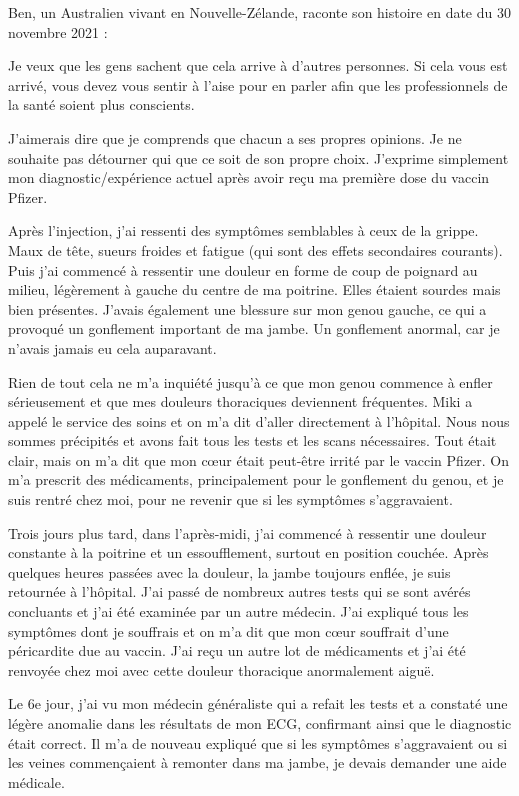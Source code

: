 Ben, un Australien vivant en Nouvelle-Zélande, raconte son histoire en date du
30 novembre 2021 :

Je veux que les gens sachent que cela arrive à d'autres personnes. Si cela vous
est arrivé, vous devez vous sentir à l'aise pour en parler afin que les
professionnels de la santé soient plus conscients.

J'aimerais dire que je comprends que chacun a ses propres opinions. Je ne
souhaite pas détourner qui que ce soit de son propre choix. J'exprime simplement
mon diagnostic/expérience actuel après avoir reçu ma première dose du vaccin
Pfizer.

Après l'injection, j'ai ressenti des symptômes semblables à ceux de la
grippe. Maux de tête, sueurs froides et fatigue (qui sont des effets secondaires
courants). Puis j'ai commencé à ressentir une douleur en forme de coup de
poignard au milieu, légèrement à gauche du centre de ma poitrine. Elles étaient
sourdes mais bien présentes. J'avais également une blessure sur mon genou
gauche, ce qui a provoqué un gonflement important de ma jambe. Un gonflement
anormal, car je n'avais jamais eu cela auparavant.

Rien de tout cela ne m'a inquiété jusqu'à ce que mon genou commence à enfler
sérieusement et que mes douleurs thoraciques deviennent fréquentes. Miki a
appelé le service des soins et on m'a dit d'aller directement à l'hôpital. Nous
nous sommes précipités et avons fait tous les tests et les scans
nécessaires. Tout était clair, mais on m'a dit que mon cœur était peut-être
irrité par le vaccin Pfizer. On m'a prescrit des médicaments, principalement
pour le gonflement du genou, et je suis rentré chez moi, pour ne revenir que si
les symptômes s'aggravaient.

Trois jours plus tard, dans l'après-midi, j'ai commencé à ressentir une douleur
constante à la poitrine et un essoufflement, surtout en position couchée. Après
quelques heures passées avec la douleur, la jambe toujours enflée, je suis
retournée à l'hôpital. J'ai passé de nombreux autres tests qui se sont avérés
concluants et j'ai été examinée par un autre médecin. J'ai expliqué tous les
symptômes dont je souffrais et on m'a dit que mon cœur souffrait d'une
péricardite due au vaccin. J'ai reçu un autre lot de médicaments et j'ai été
renvoyée chez moi avec cette douleur thoracique anormalement aiguë.

Le 6e jour, j'ai vu mon médecin généraliste qui a refait les tests et a constaté
une légère anomalie dans les résultats de mon ECG, confirmant ainsi que le
diagnostic était correct. Il m'a de nouveau expliqué que si les symptômes
s'aggravaient ou si les veines commençaient à remonter dans ma jambe, je devais
demander une aide médicale.

